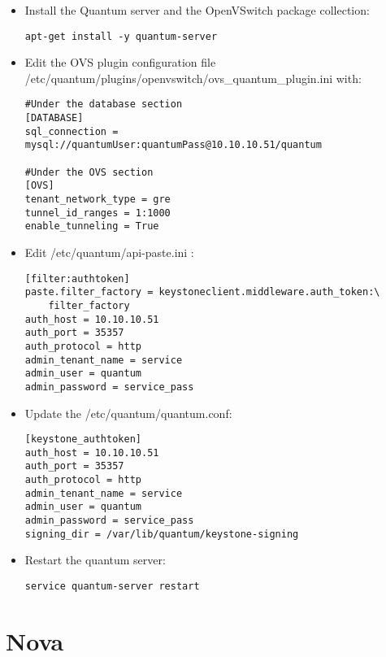 \begin{itemize}
\item Install the Quantum server and the OpenVSwitch package collection:

\begin{verbatim}
apt-get install -y quantum-server
\end{verbatim}


\item Edit the OVS plugin configuration file \slash etc\slash quantum\slash plugins\slash openvswitch\slash ovs\_quantum\_plugin.ini with:

\begin{verbatim}
#Under the database section  
[DATABASE]  
sql_connection = mysql://quantumUser:quantumPass@10.10.10.51/quantum  

#Under the OVS section  
[OVS]  
tenant_network_type = gre  
tunnel_id_ranges = 1:1000  
enable_tunneling = True  
\end{verbatim}


\item Edit \slash etc\slash quantum\slash api-paste.ini :

\begin{verbatim}
[filter:authtoken]  
paste.filter_factory = keystoneclient.middleware.auth_token:\
    filter_factory  
auth_host = 10.10.10.51  
auth_port = 35357  
auth_protocol = http  
admin_tenant_name = service  
admin_user = quantum  
admin_password = service_pass  
\end{verbatim}


\item Update the \slash etc\slash quantum\slash quantum.conf:

\begin{verbatim}
[keystone_authtoken]  
auth_host = 10.10.10.51  
auth_port = 35357  
auth_protocol = http  
admin_tenant_name = service  
admin_user = quantum  
admin_password = service_pass  
signing_dir = /var/lib/quantum/keystone-signing  
\end{verbatim}


\item Restart the quantum server:

\begin{verbatim}
service quantum-server restart
\end{verbatim}


\end{itemize}

\section{Nova}
\label{nova}


